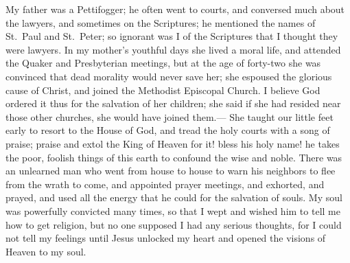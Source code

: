 \documentclass{article}
\begin{document}
My father was a Pettifogger; he often went to courts, and conversed much about the lawyers, and sometimes on the Scriptures; he mentioned the names of St.\ Paul and St.\ Peter; so ignorant was I of the Scriptures that I thought they were lawyers.
In my mother's youthful days she lived a moral life, and attended the Quaker and Presbyterian meetings, but at the age of forty-two she was convinced that dead morality would never save her; she espoused the glorious cause of Christ, and joined the Methodist Episcopal Church.
I believe God ordered it thus for the salvation of her children; she said if she had resided near those other churches, she would have joined them.---
She taught our little feet early to resort to the House of God, and tread the holy courts with a song of praise; praise and extol the King of Heaven for it! bless his holy name! he takes the poor, foolish things of this earth to confound the wise and noble.
There was an unlearned man who went from house to house to warn his neighbors to flee from the wrath to come, and appointed prayer meetings, and exhorted, and prayed, and used all the energy that he could for the salvation of souls.
My soul was powerfully convicted many times, so that I wept and wished him to tell me how to get religion, but no one supposed I had any serious thoughts, for I could not tell my feelings until Jesus unlocked my heart and opened the visions of Heaven to my soul.
\end{document}
